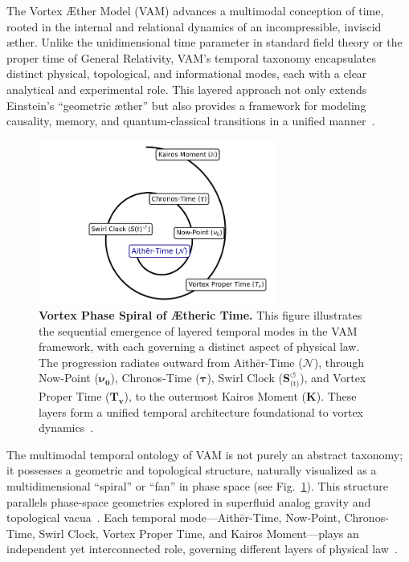 The Vortex Æther Model (VAM) advances a multimodal conception of time, rooted in the internal and relational dynamics of an incompressible, inviscid æther. Unlike the unidimensional time parameter in standard field theory or the proper time of General Relativity, VAM’s temporal taxonomy encapsulates distinct physical, topological, and informational modes, each with a clear analytical and experimental role. This layered approach not only extends Einstein’s “geometric æther” but also provides a framework for modeling causality, memory, and quantum-classical transitions in a unified manner~\cite{VAM-8, VAM-13, VAM-15}.

\begin{figure}[htb]
    \centering
    \includegraphics[width=0.7\textwidth]{TemporalOntology}
    \caption{
        \textbf{Vortex Phase Spiral of Ætheric Time.} This figure illustrates the sequential emergence of layered temporal modes in the VAM framework, with each governing a distinct aspect of physical law. The progression radiates outward from Aithēr-Time ($\boldsymbol{\mathcal{N}}$), through Now-Point ($\boldsymbol{\nu_0}$), Chronos-Time ($\boldsymbol{\tau}$), Swirl Clock ($\boldsymbol{S}^{\boldsymbol{\circlearrowleft}}_\text{(t)}$), and Vortex Proper Time ($\boldsymbol{T_v}$), to the outermost Kairos Moment ($\mathbb{\boldsymbol{K}}$). These layers form a unified temporal architecture foundational to vortex dynamics~\cite{VAM-8, VAM-13}.
    }

    \label{fig:temporal_ontology}
\end{figure}

The multimodal temporal ontology of VAM is not purely an abstract taxonomy; it possesses a geometric and topological structure, naturally visualized as a multidimensional “spiral” or “fan” in phase space (see Fig.~\ref{fig:temporal_ontology}). This structure parallels phase-space geometries explored in superfluid analog gravity and topological vacua~\cite{volovik2003universe}. Each temporal mode—Aithēr-Time, Now-Point, Chronos-Time, Swirl Clock, Vortex Proper Time, and Kairos Moment—plays an independent yet interconnected role, governing different layers of physical law~\cite{VAM-8, VAM-13}.


